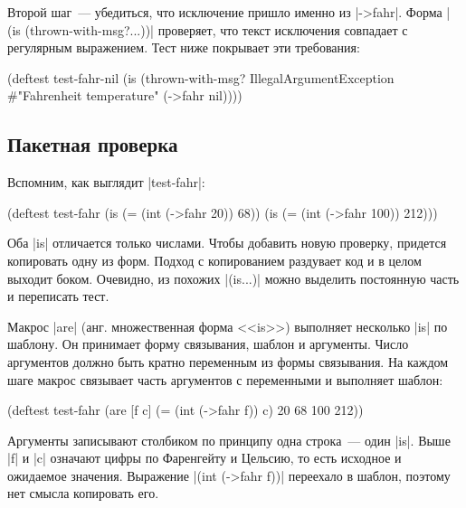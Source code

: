 Второй шаг~--- убедиться, что исключение пришло именно из \spverb|->fahr|. Форма
\spverb|(is (thrown-with-msg?...))| проверяет, что текст исключения совпадает с
регулярным выражением. Тест ниже покрывает эти требования:

\begin{english}
  \begin{clojure}
(deftest test-fahr-nil
  (is (thrown-with-msg?
       IllegalArgumentException #"Fahrenheit temperature"
       (->fahr nil))))
  \end{clojure}
\end{english}

\subsection{Пакетная проверка}

Вспомним, как выглядит \spverb|test-fahr|:

\begin{english}
  \begin{clojure}
(deftest test-fahr
  (is (= (int (->fahr 20)) 68))
  (is (= (int (->fahr 100)) 212)))
  \end{clojure}
\end{english}

Оба \spverb|is| отличается только числами. Чтобы добавить новую проверку,
придется копировать одну из форм. Подход с копированием раздувает код и в целом
выходит боком. Очевидно, из похожих \spverb|(is...)| можно выделить постоянную
часть и переписать тест.

Макрос \spverb|are| (анг. множественная форма <<is>>) выполняет несколько
\spverb|is| по шаблону. Он принимает форму связывания, шаблон и аргументы. Число
аргументов должно быть кратно переменным из формы связывания. На каждом шаге
макрос связывает часть аргументов с переменными и выполняет шаблон:

\begin{english}
  \begin{clojure}
(deftest test-fahr
  (are [f c] (= (int (->fahr f)) c)
    20 68
    100 212))
  \end{clojure}
\end{english}

Аргументы записывают столбиком по принципу одна строка~--- один
\spverb|is|. Выше \spverb|f| и \spverb|c| означают цифры по Фаренгейту и
Цельсию, то есть исходное и ожидаемое значения. Выражение \spverb|(int (->fahr f))|
переехало в шаблон, поэтому нет смысла копировать его.

